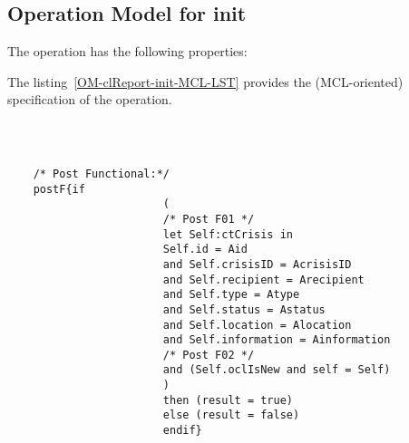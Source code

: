 \subsection{Operation Model for init}

\label{OM-init}


The  operation has the following properties:

	\begin{operationmodel}



		


	\end{operationmodel}



	\vspace{1cm}
	The listing~\ref{OM-clReport-init-MCL-LST} provides the \msrmessir (MCL-oriented) specification of the operation.
	
	\scriptsize
	\vspace{0.5cm}
	\begin{lstlisting}[style=MessirStyle,firstnumber=auto,captionpos=b,caption={\msrmessir (MCL-oriented) specification of the operation \emph{init}.},label=OM-clReport-init-MCL-LST]

	
	
	/* Post Functional:*/ 
	postF{if
						(
						/* Post F01 */
						let Self:ctCrisis in
						Self.id = Aid
						and Self.crisisID = AcrisisID
						and Self.recipient = Arecipient
						and Self.type = Atype
						and Self.status = Astatus
						and Self.location = Alocation
						and Self.information = Ainformation
						/* Post F02 */
						and (Self.oclIsNew and self = Self)
						)
						then (result = true)
						else (result = false)
						endif}
	
	
	\end{lstlisting}
	\normalsize 
	
	
	
	






